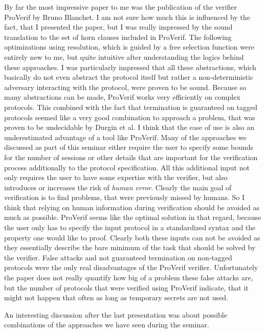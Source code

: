 \documentclass[a4paper,UKenglish]{lipics-v2018}
\begin{document}
By far the most impressive paper to me was the publication of the verifier ProVerif by Bruno Blanchet.\cite{ProVerif} I am not sure how much this is influenced by the fact, that I presented the paper, but I was really impressed by the sound translation to the set of horn clauses included in ProVerif. The following optimizations using resolution, which is guided by a free selection function were entirely new to me, but quite intuitive after understanding the logics behind these approaches. I was particularly impressed that all these abstractions, which basically do not even abstract the protocol itself but rather a non-deterministic adversary interacting with the protocol, were proven to be sound. Because so many abstractions can be made, ProVerif works very efficiently on complex protocols. This combined with the fact that termination is guaranteed on tagged protocols seemed like a very good combination to approach a problem, that was proven to be undecidable by Durgin et al.\cite{DLMS99}
I think that the ease of use is also an underestimated advantage of a tool like ProVerif. Many of the approaches we discussed as part of this seminar either require the user to specify some bounds for the number of sessions or other details that are important for the verification process additionally to the protocol specification. All this additional input not only requires the user to have some expertise with the verifier, but also introduces or increases the risk of \textit{human error}. Clearly the main goal of verification is to find problems, that were previously missed by humans. So I think that relying on human information during verification should be avoided as much as possible. ProVerif seems like the optimal solution in that regard, because the user only has to specify the input protocol in a standardized syntax and the property one would like to proof. Clearly both these inputs can not be avoided as they essentially describe the bare minimum of the task that should be solved by the verifier.
False attacks and not guaranteed termination on non-tagged protocols were the only real disadvantages of the ProVerif verifier.
Unfortunately the paper does not really quantify how big of a problem these false attacks are, but the number of protocols that were verified using ProVerif indicate, that it might not happen that often as long as temporary secrets are not used.


\vspace{1cm}

An interesting discussion after the last presentation was about possible combinations of the approaches we have seen during the seminar. 
\end{document}
